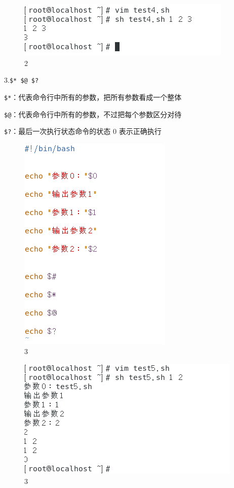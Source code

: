 \documentclass{ctexart}
\begin{document}
	\begin{figure}[H]
		\centering
		\includegraphics{2.13}
		\caption{2}
	\end{figure}
	
	3.\verb|$* $@ $?|
	
	\verb|$*|：代表命令行中所有的参数，把所有参数看成一个整体
	
	\verb|$@|：代表命令行中所有的参数，不过把每个参数区分对待
	
	\verb|$?|：最后一次执行状态命令的状态 0 表示正确执行
	
	\begin{figure}[H]
		\centering
		\includegraphics{2.14}
		\caption{3}
	\end{figure}
	
	\begin{figure}[H]
		\centering
		\includegraphics{2.15}
		\caption{3}
	\end{figure}
	
\end{document}
